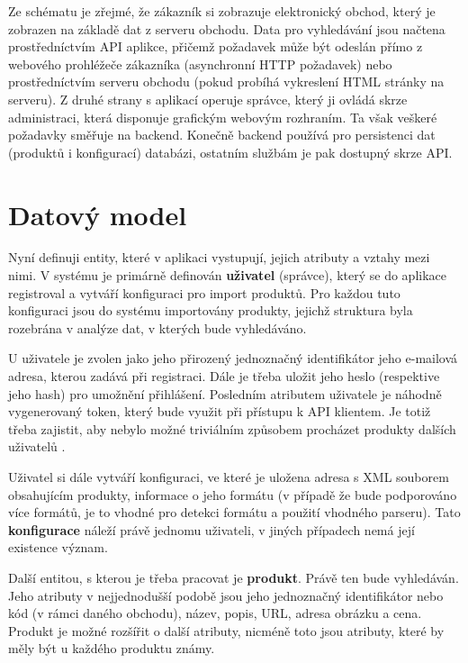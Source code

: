 \documentclass[FM,DP]{tulthesis}
\begin{document}
Ze schématu je zřejmé, že zákazník si zobrazuje elektronický obchod, který je zobrazen
na základě dat z serveru obchodu. Data pro vyhledávání jsou načtena prostředníctvím API 
aplikce, přičemž požadavek může být odeslán přímo z webového prohléžeče zákazníka 
(asynchronní HTTP požadavek) nebo prostředníctvím serveru obchodu (pokud probíhá vykreslení 
HTML stránky na serveru). Z druhé strany s aplikací operuje správce, který ji ovládá skrze
administraci, která disponuje grafickým webovým rozhraním. Ta však veškeré požadavky
směřuje na backend. Konečně backend používá pro persistenci dat (produktů i konfigurací)
databázi, ostatním službám je pak dostupný skrze API.

\section{Datový model}

Nyní definuji entity, které v aplikaci vystupují, jejich atributy a vztahy mezi nimi.
V systému je primárně definován \textbf{uživatel} (správce), který se do aplikace registroval 
a vytváří konfiguraci pro import produktů. Pro každou tuto konfiguraci jsou do systému
importovány produkty, jejichž struktura byla rozebrána v analýze dat, v kterých bude 
vyhledáváno. 

U uživatele je zvolen jako jeho přirozený jednoznačný identifikátor jeho e-mailová
adresa, kterou zadává při registraci. Dále je třeba uložit jeho heslo (respektive
jeho hash) pro umožnění přihlášení. Posledním atributem uživatele je náhodně vygenerovaný
token, který bude využit při přístupu k API klientem. Je totiž třeba zajistit, 
aby nebylo možné triviálním způsobem procházet produkty dalších uživatelů 
\cite[strana~16]{api}.

Uživatel si dále vytváří konfiguraci, ve které je uložena adresa s XML souborem 
obsahujícím produkty, informace o jeho formátu (v případě že bude podporováno více
formátů, je to vhodné pro detekci formátu a použití vhodného parseru). Tato 
\textbf{konfigurace} náleží právě jednomu uživateli, v jiných případech nemá 
její existence význam.

Další entitou, s kterou je třeba pracovat je \textbf{produkt}. Právě ten bude vyhledáván.
Jeho atributy v nejjednodušší podobě jsou jeho jednoznačný identifikátor nebo kód
(v rámci daného obchodu), název, popis, URL, adresa obrázku a cena. Produkt je možné
rozšířit o další atributy, nicméně toto jsou atributy, které by měly být u každého
produktu známy.
\end{document}
